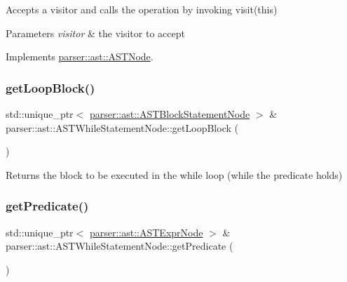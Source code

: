 Accepts a visitor and calls the operation by invoking {\ttfamily visit(this)} 
\begin{DoxyParams}{Parameters}
{\em visitor} & the visitor to accept \\
\hline
\end{DoxyParams}


Implements \hyperlink{classparser_1_1ast_1_1ASTNode_a3ff84fdfdbbc5c39b70b4d04c22e7dc3}{parser\+::ast\+::\+A\+S\+T\+Node}.

\mbox{\label{classparser_1_1ast_1_1ASTWhileStatementNode_a17d4d7573477af83900a6dda33c29e78}} 
\subsubsection{\texorpdfstring{get\+Loop\+Block()}{getLoopBlock()}}
{\footnotesize\ttfamily std\+::unique\+\_\+ptr$<$ \hyperlink{classparser_1_1ast_1_1ASTBlockStatementNode}{parser\+::ast\+::\+A\+S\+T\+Block\+Statement\+Node} $>$ \& parser\+::ast\+::\+A\+S\+T\+While\+Statement\+Node\+::get\+Loop\+Block (\begin{DoxyParamCaption}{ }\end{DoxyParamCaption})}

\begin{DoxyReturn}{Returns}
the block to be executed in the while loop (while the predicate holds) 
\end{DoxyReturn}
\mbox{\label{classparser_1_1ast_1_1ASTWhileStatementNode_af0a556a314a4b06858d8f47c94e64b86}} 
\subsubsection{\texorpdfstring{get\+Predicate()}{getPredicate()}}
{\footnotesize\ttfamily std\+::unique\+\_\+ptr$<$ \hyperlink{classparser_1_1ast_1_1ASTExprNode}{parser\+::ast\+::\+A\+S\+T\+Expr\+Node} $>$ \& parser\+::ast\+::\+A\+S\+T\+While\+Statement\+Node\+::get\+Predicate (\begin{DoxyParamCaption}{ }\end{DoxyParamCaption})}

